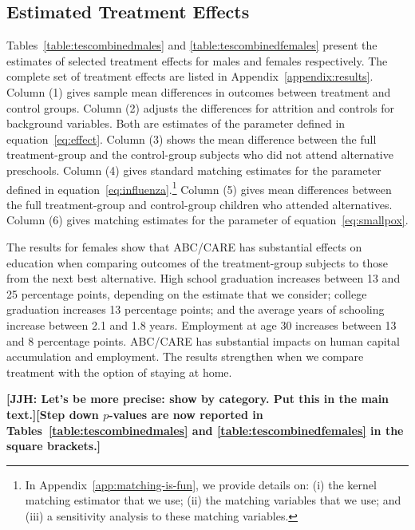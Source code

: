 \subsection{Estimated Treatment Effects}

Tables~\ref{table:tescombinedmales} and \ref{table:tescombinedfemales} present the estimates of selected treatment effects for males and females respectively. The complete set of treatment effects are listed in Appendix~\ref{appendix:results}. Column (1) gives sample mean differences in outcomes between treatment and control groups. Column (2) adjusts the differences for attrition and controls for background variables. Both are estimates of the parameter defined in equation~\eqref{eq:effect}. Column (3) shows the mean difference between the full treatment-group and the control-group subjects who did not attend alternative preschools. Column (4) gives standard matching estimates for the parameter defined in equation~\eqref{eq:influenza}.\footnote{In Appendix~\ref{app:matching-is-fun}, we provide details on: (i) the kernel matching estimator that we use; (ii) the matching variables that we use; and (iii) a sensitivity analysis to these matching variables.} Column (5) gives mean differences between the full treatment-group and control-group children who attended alternatives. Column (6) gives matching estimates for the parameter of equation~\eqref{eq:smallpox}.

The results for females show that ABC/CARE has substantial effects on education when comparing outcomes of the treatment-group subjects to those from the next best alternative. High school graduation increases between 13 and 25 percentage points, depending on the estimate that we consider; college graduation increases 13 percentage points; and the average years of schooling increase between 2.1 and 1.8 years. Employment at age 30 increases between 13 and 8 percentage points. ABC/CARE has substantial impacts on human capital accumulation and employment. The results strengthen when we compare treatment with the option of staying at home.

\textbf{[JJH: Let's be more precise: show by category. Put this in the main text.][Step down $p$-values are now reported in Tables~\ref{table:tescombinedmales} and \ref{table:tescombinedfemales} in the square brackets.]}

